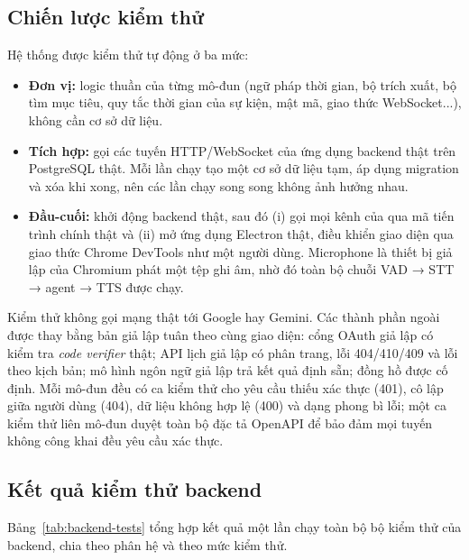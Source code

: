 \subsection{Chiến lược kiểm thử}
Hệ thống được kiểm thử tự động ở ba mức:
\begin{itemize}
  \item \textbf{Đơn vị:} logic thuần của từng mô-đun (ngữ pháp thời gian, bộ trích xuất, bộ tìm mục tiêu, quy tắc thời gian của sự kiện, mật mã, giao thức WebSocket...), không cần cơ sở dữ liệu.
  \item \textbf{Tích hợp:} gọi các tuyến HTTP/WebSocket của ứng dụng backend thật trên PostgreSQL thật. Mỗi lần chạy tạo một cơ sở dữ liệu tạm, áp dụng migration và xóa khi xong, nên các lần chạy song song không ảnh hưởng nhau.
  \item \textbf{Đầu-cuối:} khởi động backend thật, sau đó (i) gọi mọi kênh của  qua mã tiến trình chính thật và (ii) mở ứng dụng Electron thật, điều khiển giao diện qua giao thức Chrome DevTools như một người dùng. Microphone là thiết bị giả lập của Chromium phát một tệp ghi âm, nhờ đó toàn bộ chuỗi VAD → STT → agent → TTS được chạy.
\end{itemize}
Kiểm thử không gọi mạng thật tới Google hay Gemini. Các thành phần ngoài được thay bằng bản giả lập tuân theo cùng giao diện: cổng OAuth giả lập có kiểm tra \textit{code verifier} thật; API lịch giả lập có phân trang, lỗi 404/410/409 và lỗi theo kịch bản; mô hình ngôn ngữ giả lập trả kết quả định sẵn; đồng hồ được cố định. Mỗi mô-đun đều có ca kiểm thử cho yêu cầu thiếu xác thực (401), cô lập giữa người dùng (404), dữ liệu không hợp lệ (400) và dạng phong bì lỗi; một ca kiểm thử liên mô-đun duyệt toàn bộ đặc tả OpenAPI để bảo đảm mọi tuyến không công khai đều yêu cầu xác thực.

\subsection{Kết quả kiểm thử backend}
Bảng~\ref{tab:backend-tests} tổng hợp kết quả một lần chạy toàn bộ bộ kiểm thử của backend, chia theo phân hệ và theo mức kiểm thử.

